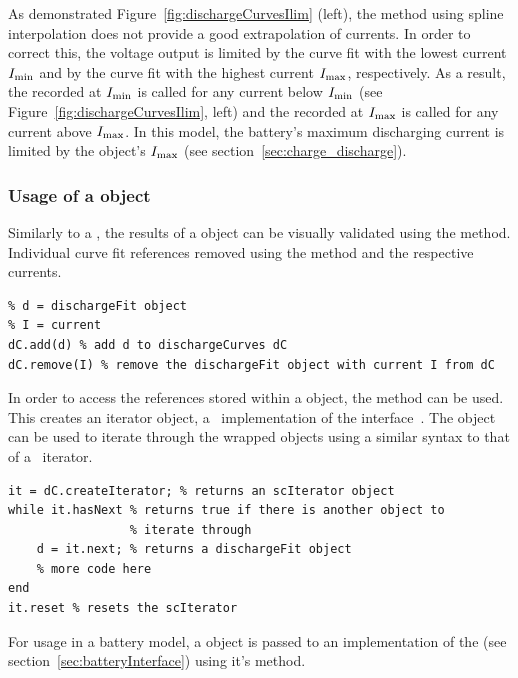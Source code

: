 As demonstrated Figure~\ref{fig:dischargeCurvesIlim} (left), the  method using spline interpolation does not provide a good extrapolation of currents. In order to correct this, the voltage output is limited by the curve fit with the lowest current $I_\text{min}$ and by the curve fit with the highest current $I_\text{max}$, respectively. As a result, the  recorded at $I_\text{min}$ is called for any current below $I_\text{min}$ (see Figure~\ref{fig:dischargeCurvesIlim}, left) and the  recorded at $I_\text{max}$ is called for any current above $I_\text{max}$. In this model, the battery's maximum discharging current is limited by the  object's $I_\text{max}$ (see section~\ref{sec:charge_discharge}).

\subsubsection{Usage of a  object}
Similarly to a , the results of a  object can be visually validated using the  method. Individual curve fit references removed using the  method and the respective currents. \clearpage
\begin{lstlisting}
% d = dischargeFit object
% I = current
dC.add(d) % add d to dischargeCurves dC
dC.remove(I) % remove the dischargeFit object with current I from dC
\end{lstlisting}
In order to access the  references stored within a  object, the  method can be used. This creates an iterator object, a \matlab\ implementation of the  interface~\cite{_iterator_????}. The object can be used to iterate through the wrapped  objects using a similar syntax to that of a \java\ iterator.
\begin{lstlisting}
it = dC.createIterator; % returns an scIterator object
while it.hasNext % returns true if there is another object to
				 % iterate through
	d = it.next; % returns a dischargeFit object
	% more code here
end
it.reset % resets the scIterator
\end{lstlisting}
For usage in a battery model, a  object is passed to an implementation of the  (see section~\ref{sec:batteryInterface}) using it's  method.
